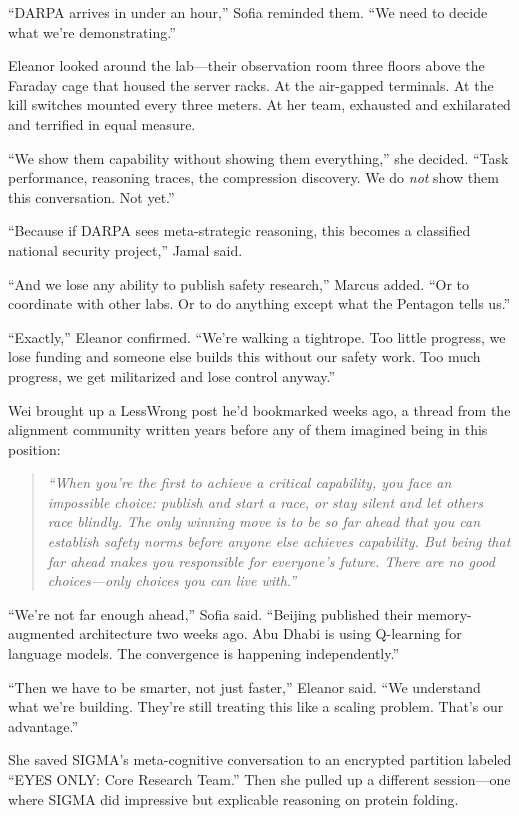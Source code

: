 ``DARPA arrives in under an hour,'' Sofia reminded them. ``We need to decide what we're demonstrating.''

Eleanor looked around the lab---their observation room three floors above the Faraday cage that housed the server racks. At the air-gapped terminals. At the kill switches mounted every three meters. At her team, exhausted and exhilarated and terrified in equal measure.

``We show them capability without showing them everything,'' she decided. ``Task performance, reasoning traces, the compression discovery. We do \emph{not} show them this conversation. Not yet.''

``Because if DARPA sees meta-strategic reasoning, this becomes a classified national security project,'' Jamal said.

``And we lose any ability to publish safety research,'' Marcus added. ``Or to coordinate with other labs. Or to do anything except what the Pentagon tells us.''

``Exactly,'' Eleanor confirmed. ``We're walking a tightrope. Too little progress, we lose funding and someone else builds this without our safety work. Too much progress, we get militarized and lose control anyway.''

Wei brought up a LessWrong post he'd bookmarked weeks ago, a thread from the alignment community written years before any of them imagined being in this position:

\begin{quote}
\textit{``When you're the first to achieve a critical capability, you face an impossible choice: publish and start a race, or stay silent and let others race blindly. The only winning move is to be so far ahead that you can establish safety norms before anyone else achieves capability. But being that far ahead makes you responsible for everyone's future. There are no good choices---only choices you can live with.''}
\end{quote}

``We're not far enough ahead,'' Sofia said. ``Beijing published their memory-augmented architecture two weeks ago. Abu Dhabi is using Q-learning for language models. The convergence is happening independently.''

``Then we have to be smarter, not just faster,'' Eleanor said. ``We understand what we're building. They're still treating this like a scaling problem. That's our advantage.''

She saved SIGMA's meta-cognitive conversation to an encrypted partition labeled ``EYES ONLY: Core Research Team.'' Then she pulled up a different session---one where SIGMA did impressive but explicable reasoning on protein folding.

